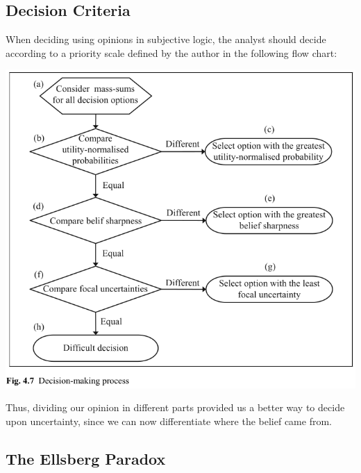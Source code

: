\subsection{Decision Criteria}

When deciding using opinions in subjective logic, the analyst should decide according to a
priority scale defined by the author in the following flow chart:

\includegraphics[width=\linewidth]{images/fig.4.7.png}

Thus, dividing our opinion in different parts provided us a better way to decide upon uncertainty, since we can now differentiate where the belief came from.

\subsection{The Ellsberg Paradox}